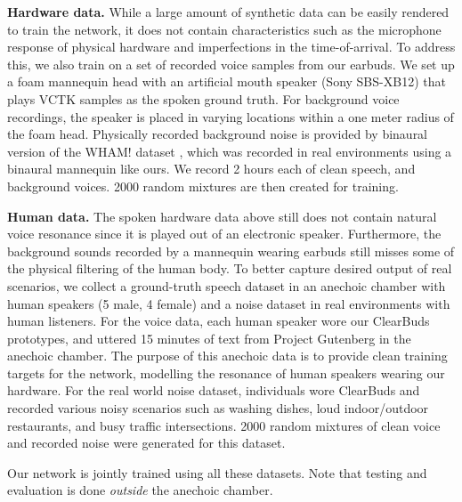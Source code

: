 \documentclass [11pt, proquest] {uwthesis}[2020/02/24]
\begin{document}
{\bf Hardware data. } While a large amount of synthetic data can be easily rendered to train the network, it does not contain characteristics such as the microphone response of physical hardware and imperfections in the time-of-arrival. To address this, we also train on a set of recorded voice samples from our earbuds. We set up a foam mannequin head with an  artificial mouth speaker (Sony SBS-XB12) that plays VCTK samples as the spoken ground truth. For background voice recordings, the speaker is placed in varying locations within a one meter radius of the foam head. Physically recorded background noise is provided by binaural version of the WHAM! dataset \cite{wham}, which was recorded in real environments using a binaural mannequin like ours. We record 2 hours each of clean speech, and background voices. 2000 random mixtures are then created for training.

{\bf Human data.} The spoken hardware data above still does not contain natural voice resonance since it is played out of an electronic speaker. Furthermore, the background sounds recorded by a mannequin wearing earbuds still misses some of the physical filtering of the human body. To better capture desired output of real scenarios, we collect a ground-truth speech dataset in an anechoic chamber with human speakers (5 male, 4 female) and a noise dataset in real environments with human listeners. For the voice data, each human speaker wore our ClearBuds prototypes, and uttered 15 minutes of text from Project Gutenberg in the anechoic chamber. The purpose of this anechoic data is to provide clean training targets for the network, modelling the resonance of human speakers wearing our hardware.
For the real world  noise dataset, individuals wore ClearBuds and recorded various noisy scenarios such as washing dishes, loud indoor/outdoor restaurants, and busy traffic intersections. 2000  random mixtures of clean voice and recorded noise were generated for this dataset. 

Our network is jointly trained using all these  datasets. Note that  testing and evaluation is  done  {\it outside} the anechoic chamber. 


\end{document}
